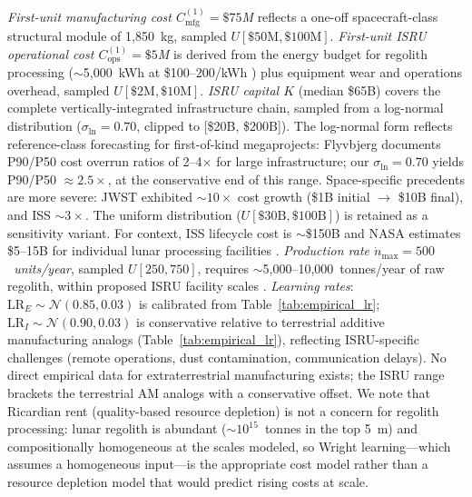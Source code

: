 \documentclass[preprint,12pt]{elsarticle}
\begin{document}
\emph{First-unit manufacturing cost $C_{\mathrm{mfg}}^{(1)} = \$75$M} reflects a one-off spacecraft-class structural module of 1{,}850~kg, sampled $U[\$50\text{M}, \$100\text{M}]$. \emph{First-unit ISRU operational cost $C_{\mathrm{ops}}^{(1)} = \$5$M} is derived from the energy budget for regolith processing ($\sim$5{,}000~kWh at \$100--200/kWh \cite{cilliers2023}) plus equipment wear and operations overhead, sampled $U[\$2\text{M}, \$10\text{M}]$. \emph{ISRU capital $K$} (median \$65B) covers the complete vertically-integrated infrastructure chain, sampled from a log-normal distribution ($\sigma_{\ln} = 0.70$, clipped to [\$20B, \$200B]). The log-normal form reflects reference-class forecasting for first-of-kind megaprojects: Flyvbjerg \cite{flyvbjerg2014} documents P90/P50 cost overrun ratios of 2--4$\times$ for large infrastructure; our $\sigma_{\ln} = 0.70$ yields P90/P50 $\approx 2.5\times$, at the conservative end of this range. Space-specific precedents are more severe: JWST exhibited ${\sim}10\times$ cost growth (\$1B initial $\to$ \$10B final), and ISS ${\sim}3\times$. The uniform distribution ($U[\$30\text{B}, \$100\text{B}]$) is retained as a sensitivity variant. For context, ISS lifecycle cost is $\sim$\$150B and NASA estimates \$5--15B for individual lunar processing facilities \cite{sanders2015,nasa2015handbook}. \emph{Production rate $\dot{n}_{\max} = 500$~units/year}, sampled $U[250, 750]$, requires $\sim$5{,}000--10{,}000~tonnes/year of raw regolith, within proposed ISRU facility scales \cite{sanders2015}. \emph{Learning rates}: $\mathrm{LR}_E \sim \mathcal{N}(0.85, 0.03)$ is calibrated from Table~\ref{tab:empirical_lr}; $\mathrm{LR}_I \sim \mathcal{N}(0.90, 0.03)$ is conservative relative to terrestrial additive manufacturing analogs (Table~\ref{tab:empirical_lr}), reflecting ISRU-specific challenges (remote operations, dust contamination, communication delays). No direct empirical data for extraterrestrial manufacturing exists; the ISRU range brackets the terrestrial AM analogs with a conservative offset. We note that Ricardian rent (quality-based resource depletion) is not a concern for regolith processing: lunar regolith is abundant (${\sim}10^{15}$~tonnes in the top 5~m) and compositionally homogeneous at the scales modeled, so Wright learning---which assumes a homogeneous input---is the appropriate cost model rather than a resource depletion model that would predict rising costs at scale.
\end{document}
